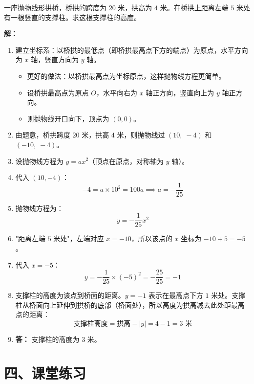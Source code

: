 \documentclass[12pt, a4paper]{ctexart}
\begin{document}
\begin{appbox}[【应用 3】抛物线形拱桥问题]
一座抛物线形拱桥，桥拱的跨度为 $20$ 米，拱高为 $4$ 米。在桥拱上距离左端 $5$ 米处有一根竖直的支撑柱。求这根支撑柱的高度。
\end{appbox}

\textbf{解：}
\begin{enumerate}[leftmargin=2em]
  \item 建立坐标系：以桥拱的最低点（即桥拱最高点下方的端点）为原点，水平方向为 $x$ 轴，竖直方向为 $y$ 轴。
  \begin{itemize}
    \item 更好的做法：以桥拱最高点为坐标原点，这样抛物线方程更简单。
    \item 设桥拱最高点为原点 $O$，水平向右为 $x$ 轴正方向，竖直向上为 $y$ 轴正方向。
    \item 则抛物线开口向下，顶点为 $(0, 0)$。
  \end{itemize}
  \item 由题意，桥拱跨度 $20$ 米，拱高 $4$ 米，则抛物线过 $(10,\; -4)$ 和 $(-10,\; -4)$。
  \item 设抛物线方程为 $y = ax^2$（顶点在原点，对称轴为 $y$ 轴）。
  \item 代入 $(10, -4)$：
  \[
  -4 = a \times 10^2 = 100a \implies a = -\frac{1}{25}
  \]
  \item 抛物线方程为：
  \[
  y = -\frac{1}{25}x^2
  \]
  \item "距离左端 $5$ 米处"，左端对应 $x = -10$，所以该点的 $x$ 坐标为 $-10 + 5 = -5$。
  \item 代入 $x = -5$：
  \[
  y = -\frac{1}{25} \times (-5)^2 = -\frac{25}{25} = -1
  \]
  \item 支撑柱的高度为该点到桥面的距离。$y = -1$ 表示在最高点下方 $1$ 米处。支撑柱从桥面向上延伸到拱桥的底部（桥面处），所以高度为拱高减去此处距最高点的距离：
  \[
  \text{支撑柱高度} = \text{拱高} - |y| = 4 - 1 = 3 \text{ 米}
  \]
  \item \textbf{答：} 支撑柱的高度为 $3$ 米。
\end{enumerate}


\section*{\textcolor{tipgreen}{四、课堂练习}}
\end{document}

